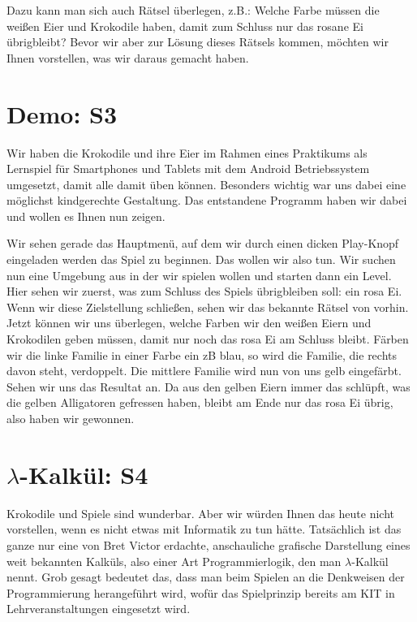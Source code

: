 \documentclass{scrartcl}
\begin{document}
	Dazu kann man sich auch Rätsel überlegen, z.B.:
	Welche Farbe müssen die weißen Eier und Krokodile haben, damit zum Schluss nur das rosane Ei übrigbleibt?
	Bevor wir aber zur Lösung dieses Rätsels kommen, möchten wir Ihnen vorstellen, was wir daraus gemacht haben.


	\section{Demo: S3}
	Wir haben die Krokodile und ihre Eier im Rahmen eines Praktikums als Lernspiel für Smartphones und Tablets mit dem Android Betriebssystem umgesetzt, damit alle damit üben können.
	Besonders wichtig war uns dabei eine möglichst kindgerechte Gestaltung.
	Das entstandene Programm haben wir dabei und wollen es Ihnen nun zeigen.

	Wir sehen gerade das Hauptmenü, auf dem wir durch einen dicken Play-Knopf eingeladen werden das Spiel zu beginnen.
	Das wollen wir also tun.
	Wir suchen nun eine Umgebung aus in der wir spielen wollen und starten dann ein Level.
	Hier sehen wir zuerst, was zum Schluss des Spiels übrigbleiben soll: ein rosa Ei.
	Wenn wir diese Zielstellung schließen, sehen wir das bekannte Rätsel von vorhin.
	Jetzt können wir uns überlegen, welche Farben wir den weißen Eiern und Krokodilen geben müssen, damit nur noch das rosa Ei am Schluss bleibt.
	Färben wir die linke Familie in einer Farbe ein zB blau, so wird die Familie, die rechts davon steht, verdoppelt.
	Die mittlere Familie wird nun von uns gelb eingefärbt.
	Sehen wir uns das Resultat an.
	Da aus den gelben Eiern immer das schlüpft, was die gelben Alligatoren gefressen haben, bleibt am Ende nur das rosa Ei übrig, also haben wir gewonnen. 
	
	
	

	\section{$\lambda$-Kalkül: S4}
	Krokodile und Spiele sind wunderbar.
	Aber wir würden Ihnen das heute nicht vorstellen, wenn es nicht etwas mit Informatik zu tun hätte.
	Tatsächlich ist das ganze nur eine von Bret Victor erdachte, anschauliche grafische Darstellung eines weit bekannten Kalküls, also einer Art Programmierlogik, den man $\lambda$-Kalkül nennt.
	Grob gesagt bedeutet das, dass man beim Spielen an die Denkweisen der Programmierung herangeführt wird, wofür das Spielprinzip bereits am KIT in Lehrveranstaltungen eingesetzt wird.
\end{document}
